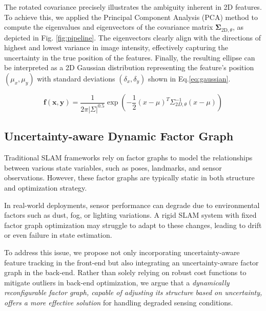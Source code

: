 
The rotated covariance precisely illustrates the ambiguity inherent in 2D features. To achieve this, we applied the Principal Component Analysis (PCA) method to compute the eigenvalues and eigenvectors of the covariance matrix $\boldsymbol{\Sigma}_{2 \mathrm{D}, \theta}$, as depicted in Fig. \ref{fig:pipeline}. The eigenvectors clearly align with the directions of highest and lowest variance in image intensity, effectively capturing the uncertainty in the true position of the features. Finally, the resulting ellipse can be interpreted as a 2D Gaussian distribution representing the feature's position $\left(\mu_x, \mu_y\right)$ with standard deviations $\left(\delta_x, \delta_y\right)$ shown in Eq.\ref{eq:gaussian}.

\begin{equation}
    \pmb{f(x, y)} = \frac{1}{{2\pi |\Sigma|^{0.5}}} \exp\left(-\frac{1}{2}(x - \mu)^T \Sigma_{2D,\theta}^{-1} (x - \mu)\right)
    \label{eq:gaussian}
\end{equation}


\subsection{Uncertainty-aware Dynamic Factor Graph}
Traditional SLAM frameworks rely on factor graphs to model the relationships between various state variables, such as poses, landmarks, and sensor observations. However, these factor graphs are typically static in both structure and optimization strategy.

In real-world deployments, sensor performance can degrade due to environmental factors such as dust, fog, or lighting variations. A rigid SLAM system with fixed factor graph optimization may struggle to adapt to these changes, leading to drift or even failure in state estimation.

To address this issue, we propose not only incorporating uncertainty-aware feature tracking in the front-end but also integrating an uncertainty-aware factor graph in the back-end. Rather than solely relying on robust cost functions \cite{concha2015evaluation} to mitigate outliers in back-end optimization, we argue that a \textit{dynamically reconfigurable factor graph, capable of adjusting its structure based on uncertainty, offers a more effective solution} for handling degraded sensing conditions.


